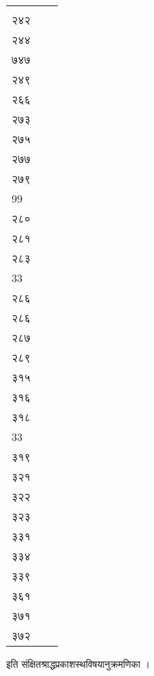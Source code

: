 \documentclass[11pt, openany]{book}
\begin{document}
{{{{{{{{{{{{\begin{longtable}[]{@{}lll@{}}
\begin{minipage}[t]{0.30\columnwidth}
{२४१\\
२४२\\
२४४\\
७४७\\
२४९\\
२६६\\
२७३\\
२७५\\
२७७\\
२७९\\
99\\
२८०\\
२८१\\
२८३\\
33\\
२८६\\
२८६\\
२८७\\
२८९\\
३१५\\
३१६\\
३१८\\
33\\
३१९\\
३२१\\
३२२\\
३२३\\
३३१\\
३३४\\
३३९\\
३६१\\
३७१\\
३७२}\strut
\end{minipage}\tabularnewline
\bottomrule
\end{longtable}

{ इति संक्षितश्राद्धप्रकाशस्थविषयानुक्रमणिका ।\\
~\\
~\\
~\\


}}}}}}}}}}}}}
\end{document}
